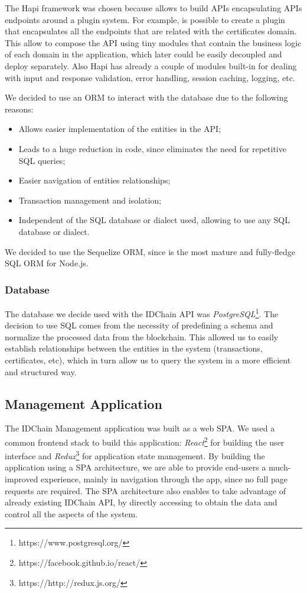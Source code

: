 The Hapi framework was chosen because allows to build APIs encapsulating APIs endpoints around a plugin system. For example, is possible to create a plugin that encapsulates all the endpoints that are related with the certificates domain.
This allow to compose the API using tiny modules that contain the business logic of each domain in the application, which later could be easily decoupled and deploy separately.
Also Hapi has already a couple of modules built-in for dealing with input and response validation, error handling, session caching, logging, etc.

We decided to use an \ac{ORM} to interact with the database due to the following reasons:

\begin{itemize}
  \item Allows easier implementation of the entities in the API;
  \item Leads to a huge reduction in code, since eliminates the need for repetitive SQL queries;
  \item Easier navigation of entities relationships;
  \item Transaction management and isolation;
  \item Independent of the SQL database or dialect used, allowing to use any SQL database or dialect.
\end{itemize}

We decided to use the Sequelize ORM, since is the most mature and fully-fledge SQL ORM for Node.js.

\subsubsection{Database}

The database we decide used with the IDChain API was \textit{PostgreSQL}\footnote{https://www.postgresql.org/}.
The decision to use SQL comes from the necessity of predefining a schema and normalize the processed data from the blockchain.
This allowed us to easily establish relationships between the entities in the system (transactions, certificates, etc), which in turn allow us to query the system in a more efficient and structured way.

\subsection{Management Application}
The IDChain Management application was built as a web \ac{SPA}.
We used a common frontend stack to build this application: \textit{React}\footnote{https://facebook.github.io/react/} for building the user interface and \textit{Redux}\footnote{https://http://redux.js.org/} for application state management.
By building the application using a SPA architecture, we are able to provide end-users a much-improved experience, mainly in navigation through the app, since no full page requests are required.
The \ac{SPA} architecture also enables to take advantage of already existing IDChain API, by directly accessing to obtain the data and control all the aspects of the system.

